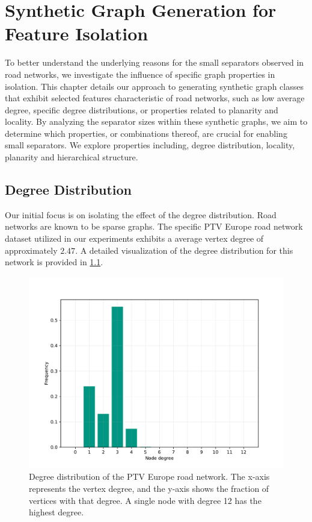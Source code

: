 \chapter{Synthetic Graph Generation for Feature Isolation}

To better understand the underlying reasons for the small separators observed in road networks, we investigate the influence of specific graph properties in isolation.
This chapter details our approach to generating synthetic graph classes that exhibit selected features characteristic of road networks, such as low average degree, specific degree distributions, or properties related to planarity and locality.
By analyzing the separator sizes within these synthetic graphs, we aim to determine which properties, or combinations thereof, are crucial for enabling small separators.
We explore properties including, degree distribution, locality, planarity and hierarchical structure.

\section{Degree Distribution}

Our initial focus is on isolating the effect of the degree distribution.
Road networks are known to be sparse graphs.
The specific PTV Europe road network dataset \cite{ptv_group_dimacs-europe_2009} utilized in our experiments exhibits a average vertex degree of approximately \(2.47\).
A detailed visualization of the degree distribution for this network is provided in \cref{fig:degree_dist_europe}.

\begin{figure}
	\centering
	\includegraphics[width=0.6\linewidth]{graphics/degree_overview_europe.pdf}
	\caption{Degree distribution of the PTV Europe road network. The x-axis represents the vertex degree, and the y-axis shows the fraction of vertices with that degree. A single node with degree 12 has the highest degree.}
	\label{fig:degree_dist_europe}
\end{figure}

